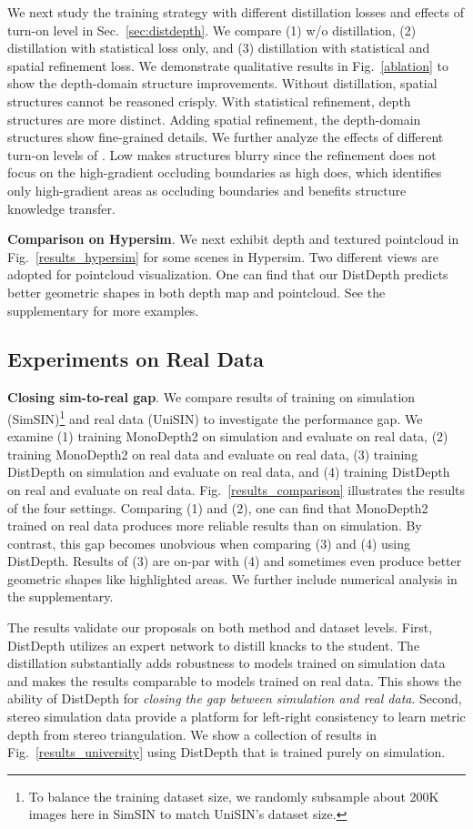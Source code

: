 \documentclass[10pt,twocolumn,letterpaper]{article}
\begin{document}
We next study the training strategy with different distillation losses and effects of turn-on level  in Sec.~\ref{sec:distdepth}. We compare (1) w/o distillation, (2) distillation with statistical loss only, and (3) distillation with statistical and spatial refinement loss. We demonstrate qualitative results in Fig.~\ref{ablation} to show the depth-domain structure improvements. Without distillation, spatial structures cannot be reasoned crisply. With statistical refinement, depth structures are more distinct. Adding spatial refinement, the depth-domain structures show fine-grained details. We further analyze the effects of different turn-on levels of . Low  makes structures blurry since the refinement does not focus on the high-gradient occluding boundaries as high  does, which identifies only high-gradient areas as occluding boundaries and benefits structure knowledge transfer.

\textbf{Comparison on Hypersim}. We next exhibit depth and textured pointcloud in Fig.~\ref{results_hypersim} for some scenes in Hypersim. Two different views are adopted for pointcloud visualization. One can find that our DistDepth predicts better geometric shapes in both depth map and pointcloud. See the supplementary for more examples.

\subsection{Experiments on Real Data}

\textbf{Closing sim-to-real gap}. We compare results of training on simulation (SimSIN)\footnote{To balance the training dataset size, we randomly subsample about 200K images here in SimSIN to match UniSIN's dataset size.} and real data (UniSIN) to investigate the performance gap.
We examine (1) training MonoDepth2 on simulation and evaluate on real data, (2) training MonoDepth2 on real data and evaluate on real data, (3) training DistDepth on simulation and evaluate on real data, and (4) training DistDepth on real and evaluate on real data. Fig.~\ref{results_comparison} illustrates the results of the four settings. Comparing (1) and (2), one can find that MonoDepth2 trained on real data produces more reliable results than on simulation. By contrast, this gap becomes unobvious when comparing (3) and (4) using DistDepth. Results of (3) are on-par with (4) and sometimes even produce better geometric shapes like highlighted areas. We further include numerical analysis in the supplementary.

The results validate our proposals on both method and dataset levels. First, DistDepth utilizes an expert network to distill knacks to the student. The distillation substantially adds robustness to models trained on simulation data and makes the results comparable to models trained on real data. This shows the ability of DistDepth for \textit{closing the gap between simulation and real data}. Second, stereo simulation data provide a platform for left-right consistency to learn metric depth from stereo triangulation. We show a collection of results in Fig.~\ref{results_university} using DistDepth that is trained purely on simulation.
\end{document}
